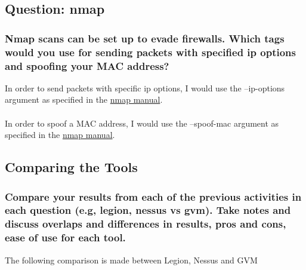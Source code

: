 \subsection{Question: nmap}
\subsubsection{Nmap scans can be set up to evade firewalls. Which tags would you use for sending packets with specified ip options and spoofing your MAC address?}
In order to send packets with specific ip options, I would use the --ip-options argument as specified in the \href{https://nmap.org/book/man-bypass-firewalls-ids.html}{nmap manual}.
\\\\
In order to spoof a MAC address, I would use the --spoof-mac argument as specified in the \href{https://nmap.org/book/man-bypass-firewalls-ids.html}{nmap manual}.

\subsection{Comparing the Tools}
\subsubsection{Compare your results from each of the previous activities in each question (e.g, legion, nessus vs gvm). Take notes and discuss overlaps and differences in results, pros and cons, ease of use for each tool.}
The following comparison is made between Legion, Nessus and GVM

